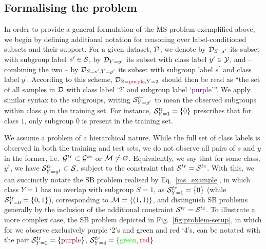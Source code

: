 \subsection{Formalising the problem}\label{ssec:problem_formalism}
In order to provide a general formulation of the \ac{MS} problem exemplified above, we begin by
defining additional notation for reasoning over label-conditioned subsets and their support. 
%
For a given dataset, \( {\mathcal{D}} \), we denote by \( {\mathcal{D}}_{S=s^\prime} \) its subset with subgroup label
\( s^\prime \in {\mathcal{S}} \), by \( {\mathcal{D}}_{Y=y^\prime} \) its subset with class label \( y^\prime \in {\mathcal{Y}}
\), and -- combining the two -- by \( {\mathcal{D}}_{S=s^\prime,Y=y^\prime} \) its subset with subgroup label
\( s^\prime \) and class label \( y^\prime \).
%
According to this scheme, \( {\mathcal{D}}_{S=\text{\color{purple}{purple}}, Y=\text{2}} \) should then be
read as ``the set of all samples in \( {\mathcal{D}} \) with class label `2' and subgroup label
`\textcolor{purple}{purple}'''.
%
We apply similar syntax to the subgroups, writing \( {\mathcal{S}}^{tr}_{Y=y^\prime} \) to mean the observed
subgroups within class \(y\) in the training set.
%
For instance, \({\mathcal{S}}^{tr}_{Y=1}=\{0\}\) prescribes that for class \(1\), only subgroup \(0\) is
present in the training set.

We assume a problem of a hierarchical nature.
%
While the full set of class labels is observed in both the training and test sets, we do not
observe all pairs of \(s\) and \(y\) in the former, i.e.\ \( {\mathcal{G}}^{tr} \subset {\mathcal{G}}^{te} \) or \({\mathcal{M}}
\neq \varnothing \). 
%
Equivalently, we say that for some class, \(y^\dagger\), we have \( {\mathcal{S}}^{tr}_{Y=y^\dagger} \subset
{\mathcal{S}} \), subject to the constraint that \(  {\mathcal{S}}^{tr} = {\mathcal{S}}^{te} \).
%
With this, we can succinctly notate the SB problem realised by Eq.~\ref{ms_example}, in which class
\(Y=1\) has no overlap with subgroup \(S=1\), as \({\mathcal{S}}^{tr}_{Y=1}=\{0\}\) (while
\({\mathcal{S}}^{tr}_{Y=0}=\{ 0, 1 \}\)), corresponding to \( {\mathcal{M}} = \{(1, 1)\} \), and distinguish SB
problems generally by the inclusion of the additional constraint \( {\mathcal{S}}^{tr} = {\mathcal{S}}^{te} \).
%
To illustrate a more complex case, the SB problem depicted in Fig.~\ref{fig:problem-setup}, in
which for we observe exclusively purple `2's and green and red `4's, can be notated with the pair
\( {\mathcal{S}}^{tr}_{Y=2}=\{\text{\textcolor{purple}{purple}\}} \), \( {\mathcal{S}}^{tr}_{Y=4}=\{
\text{\textcolor{green}{green}}, \text{\textcolor{red}{red}} \} \).
